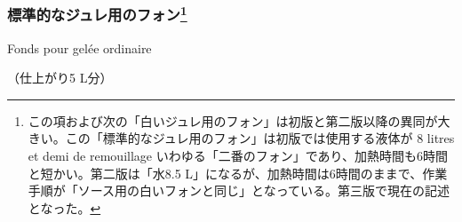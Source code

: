 \begin{recette}

\hypertarget{fonds-pour-gelee-ordinaire}{%
\subsubsection[標準的なジュレ用のフォン]{\texorpdfstring{標準的なジュレ用のフォン\footnote{この項および次の「白いジュレ用のフォン」は初版と第二版以降の異同が大きい。この「標準的なジュレ用のフォン」は初版では使用する液体が
  8 litres et demi de remouillage
  いわゆる「二番のフォン」であり、加熱時間も6時間と短かい。第二版は「水8.5
  L」になるが、加熱時間は6時間のままで、作業手順が「ソース用の白いフォンと同じ」となっている。第三版で現在の記述となった。}}{標準的なジュレ用のフォン}}\label{fonds-pour-gelee-ordinaire}}

\begin{frsubenv}

Fonds pour gelée ordinaire

\end{frsubenv}


（仕上がり5 L分）


\end{recette}
